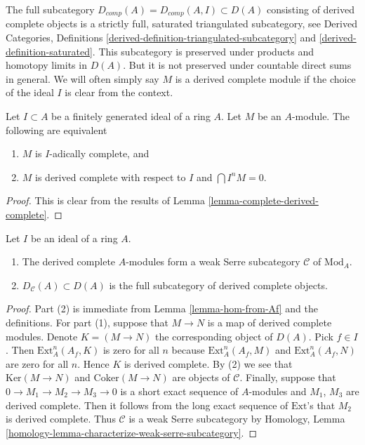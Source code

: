 \noindent
The full subcategory $D_{comp}(A) = D_{comp}(A, I) \subset D(A)$
consisting of derived complete objects is a strictly full, saturated
triangulated subcategory, see
Derived Categories, Definitions
\ref{derived-definition-triangulated-subcategory} and
\ref{derived-definition-saturated}. This subcategory is preserved
under products and homotopy limits in $D(A)$.
But it is not preserved under countable direct sums in general.
We will often simply say $M$ is a derived complete module if
the choice of the ideal $I$ is clear from the context.

\begin{proposition}
\label{proposition-derived-complete-modules}
Let $I \subset A$ be a finitely generated ideal of a ring $A$.
Let $M$ be an $A$-module. The following are equivalent
\begin{enumerate}
\item $M$ is $I$-adically complete, and
\item $M$ is derived complete with respect to $I$ and $\bigcap I^nM = 0$.
\end{enumerate}
\end{proposition}

\begin{proof}
This is clear from the results of
Lemma \ref{lemma-complete-derived-complete}.
\end{proof}

\begin{lemma}
\label{lemma-serre-subcategory}
Let $I$ be an ideal of a ring $A$.
\begin{enumerate}
\item The derived complete $A$-modules form a weak Serre
subcategory $\mathcal{C}$ of $\text{Mod}_A$.
\item $D_\mathcal{C}(A) \subset D(A)$ is the full subcategory
of derived complete objects.
\end{enumerate}
\end{lemma}

\begin{proof}
Part (2) is immediate from Lemma \ref{lemma-hom-from-Af}
and the definitions. For part (1), suppose that $M \to N$ is
a map of derived complete modules. Denote $K = (M \to N)$
the corresponding object of $D(A)$. Pick $f \in I$. Then
$\text{Ext}_A^n(A_f, K)$ is zero for all $n$ because
$\text{Ext}_A^n(A_f, M)$ and $\text{Ext}_A^n(A_f, N)$ are zero for all $n$.
Hence $K$ is derived complete. By (2) we see that $\text{Ker}(M \to N)$ and
$\text{Coker}(M \to N)$ are objects of $\mathcal{C}$.
Finally, suppose that $0 \to M_1 \to M_2 \to M_3 \to 0$
is a short exact sequence of $A$-modules and
$M_1$, $M_3$ are derived complete. Then it follows from
the long exact sequence of $\text{Ext}$'s that $M_2$
is derived complete. Thus $\mathcal{C}$ is a weak Serre subcategory by
Homology, Lemma \ref{homology-lemma-characterize-weak-serre-subcategory}.
\end{proof}

